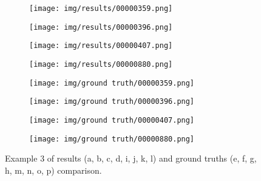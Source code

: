 \documentclass[conference]{IEEEtran}
\begin{document}
\begin{figure*}[htbp]
        \begin{subfigure}[b]{0.22\linewidth}
            \centering
            \texttt{[image: img/results/00000359.png]}
            \caption{}
            \label{res:3:359}
        \end{subfigure}
        \hfill
        \begin{subfigure}[b]{0.22\linewidth}
            \centering
            \texttt{[image: img/results/00000396.png]}
            \caption{}
            \label{res:3:396}
        \end{subfigure}
        \hfill
        \begin{subfigure}[b]{0.22\linewidth}
            \centering
            \texttt{[image: img/results/00000407.png]}
            \caption{}
            \label{res:3:407}
        \end{subfigure}
        \hfill
        \begin{subfigure}[b]{0.22\linewidth}
            \centering
            \texttt{[image: img/results/00000880.png]}
            \caption{}
            \label{res:3:880}
        \end{subfigure}

        \begin{subfigure}[b]{0.22\linewidth}
            \centering
            \texttt{[image: img/ground truth/00000359.png]}
            \caption{}
            \label{res:3:359:gt}
        \end{subfigure}
        \hfill
        \begin{subfigure}[b]{0.22\linewidth}
            \centering
            \texttt{[image: img/ground truth/00000396.png]}
            \caption{}
            \label{res:3:396:gt}
        \end{subfigure}
        \hfill
        \begin{subfigure}[b]{0.22\linewidth}
            \centering
            \texttt{[image: img/ground truth/00000407.png]}
            \caption{}
            \label{res:3:407:gt}
        \end{subfigure}
        \hfill
        \begin{subfigure}[b]{0.22\linewidth}
            \centering
            \texttt{[image: img/ground truth/00000880.png]}
            \caption{}
            \label{res:3:880:gt}
        \end{subfigure}

        \caption{Example 3 of results (a, b, c, d, i, j, k, l) and ground truths (e, f, g, h, m, n, o, p) comparison.}
        \label{res:3}
    \end{figure*}
\end{document}
